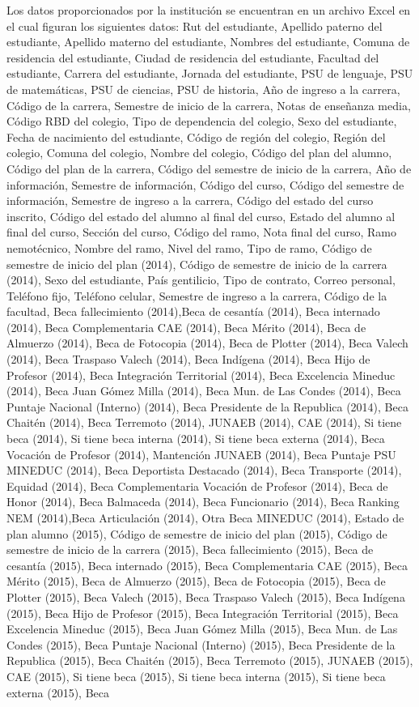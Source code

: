 Los datos proporcionados por la institución se encuentran en un archivo Excel en el cual figuran los siguientes datos: Rut del estudiante, Apellido paterno del estudiante, Apellido materno del estudiante, Nombres del estudiante, Comuna de residencia del estudiante, Ciudad de residencia del estudiante, Facultad del estudiante, Carrera del estudiante, Jornada del estudiante, PSU de lenguaje, PSU de matemáticas, PSU de ciencias, PSU de historia, Año de ingreso a la carrera, Código de la carrera, Semestre de inicio de la carrera, Notas de enseñanza media, Código RBD del colegio, Tipo de dependencia del colegio, Sexo del estudiante, Fecha de nacimiento del estudiante, Código de región del colegio, Región del colegio, Comuna del colegio, Nombre del colegio, Código del plan del alumno, Código del  plan de la carrera, Código del semestre de inicio de la carrera, Año de información, Semestre de información, Código del curso, Código del semestre de información, Semestre de ingreso a la carrera, Código del estado del curso inscrito, Código del estado del alumno al final del curso, Estado del alumno al final del curso, Sección del curso, Código del ramo, Nota final del curso, Ramo nemotécnico, Nombre del ramo, Nivel del ramo, Tipo de ramo, Código de semestre de inicio del plan (2014), Código de semestre de inicio de la carrera (2014), Sexo del estudiante, País gentilicio, Tipo de contrato, Correo personal, Teléfono fijo, Teléfono celular, Semestre de ingreso a la carrera, Código de la facultad, Beca fallecimiento (2014),Beca de cesantía (2014), Beca internado (2014), Beca Complementaria CAE (2014), Beca Mérito (2014), Beca de Almuerzo (2014), Beca de Fotocopia (2014), Beca de Plotter (2014), Beca Valech (2014), Beca Traspaso Valech (2014), Beca Indígena (2014), Beca Hijo de Profesor (2014), Beca Integración Territorial (2014), Beca Excelencia Mineduc (2014), Beca Juan Gómez Milla (2014), Beca Mun. de Las Condes (2014), Beca Puntaje Nacional (Interno) (2014), Beca Presidente de la Republica (2014), Beca Chaitén (2014), Beca Terremoto (2014), JUNAEB (2014), CAE (2014), Si tiene beca (2014), Si tiene beca interna (2014), Si tiene beca externa (2014), Beca Vocación de Profesor (2014), Mantención JUNAEB (2014), Beca Puntaje PSU MINEDUC (2014), Beca Deportista Destacado (2014), Beca Transporte (2014), Equidad (2014), Beca Complementaria Vocación de Profesor (2014), Beca de Honor (2014), Beca Balmaceda (2014), Beca Funcionario (2014), Beca Ranking NEM (2014),Beca Articulación (2014), Otra Beca MINEDUC (2014), Estado de plan alumno (2015), Código de semestre de inicio del plan (2015), Código de semestre de inicio de la carrera (2015), Beca fallecimiento (2015), Beca de cesantía (2015), Beca internado (2015), Beca Complementaria CAE (2015), Beca Mérito (2015), Beca de Almuerzo (2015), Beca de Fotocopia (2015), Beca de Plotter (2015), Beca Valech (2015), Beca Traspaso Valech (2015), Beca Indígena (2015), Beca Hijo de Profesor (2015), Beca Integración Territorial (2015), Beca Excelencia Mineduc (2015), Beca Juan Gómez Milla (2015), Beca Mun. de Las Condes (2015), Beca Puntaje Nacional (Interno) (2015), Beca Presidente de la Republica (2015), Beca Chaitén (2015), Beca Terremoto (2015), JUNAEB (2015), CAE (2015), Si tiene beca (2015), Si tiene beca interna (2015), Si tiene beca externa (2015), Beca 